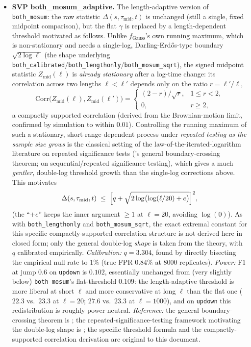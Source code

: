 \documentclass[11pt]{article}
\begin{document}
\begin{itemize}
\item \textbf{SVP both\_mosum\_adaptive.} The length-adaptive version
of \texttt{both\_mosum}: the raw statistic
$\Delta(s,\tau_{\mathrm{mid}},t)$ is unchanged (still a single, fixed
midpoint comparison), but the flat $\gamma$ is replaced by a
length-dependent threshold motivated as follows. Unlike
$f_{\mathrm{Gauss}}$'s own running maximum, which is non-stationary and
needs a single-log, Darling-Erd\H{o}s-type boundary
$\sqrt{2\log\ell}$ (the shape underlying
\texttt{both\_calibrated}/\texttt{both\_lengthonly}/\texttt{both\_mosum\_sqrt}),
the signed midpoint statistic $Z_{\mathrm{mid}}(\ell)$ is \emph{already
stationary} after a log-time change: its correlation across two lengths
$\ell<\ell'$ depends only on the ratio $r=\ell'/\ell$,
\[
\mathrm{Corr}\bigl(Z_{\mathrm{mid}}(\ell),Z_{\mathrm{mid}}(\ell')\bigr)
=\begin{cases}(2-r)/\sqrt{r}, & 1\le r<2,\\ 0, & r\ge2,\end{cases}
\]
a compactly supported correlation (derived from the Brownian-motion
limit, confirmed by simulation to within $0.01$). Controlling the running
maximum of such a stationary, short-range-dependent process under
\emph{repeated testing as the sample size grows} is the classical setting
of the law-of-the-iterated-logarithm literature on repeated significance
tests (\cite{darling1956}'s general boundary-crossing theorem;
\cite{darlingrobbins1967} on sequential/repeated significance testing),
which gives a much \emph{gentler}, double-log threshold growth than the
single-log corrections above. This motivates
\[
\Delta(s,\tau_{\mathrm{mid}},t) \;\le\;
\Bigl[q+\sqrt{2\log\bigl(\log(\ell/20)+e\bigr)}\Bigr]^2,
\]
(the ``$+e$'' keeps the inner argument $\ge1$ at $\ell=20$, avoiding
$\log(0)$). As with \texttt{both\_lengthonly} and \texttt{both\_mosum\_sqrt},
the exact extremal constant for this specific compactly-supported
correlation structure is not derived here in closed form; only the
general double-log \emph{shape} is taken from the theory, with $q$
calibrated empirically. \emph{Calibration:} $q=3.304$, found by directly
bisecting the empirical null rate to $1\%$ (true FPR $0.84\%$ at $8000$
replicates). \emph{Power:} F1 at jump $0.6$ on \texttt{updown} is
$0.102$, essentially unchanged from (very slightly below)
\texttt{both\_mosum}'s flat-threshold $0.109$: the length-adaptive
threshold is more liberal at short $\ell$ and more conservative at long
$\ell$ than the flat one ($22.3$ vs.\ $23.3$ at $\ell=20$; $27.6$ vs.\
$23.3$ at $\ell=1000$), and on \texttt{updown} this redistribution is
roughly power-neutral. \emph{Reference:} the general boundary-crossing
theorem is \cite{darling1956}; the repeated-significance-testing
framework motivating the double-log shape is
\cite{darlingrobbins1967}; the specific threshold formula and the
compactly-supported correlation derivation are original to this
document.

\end{itemize}
\end{document}
